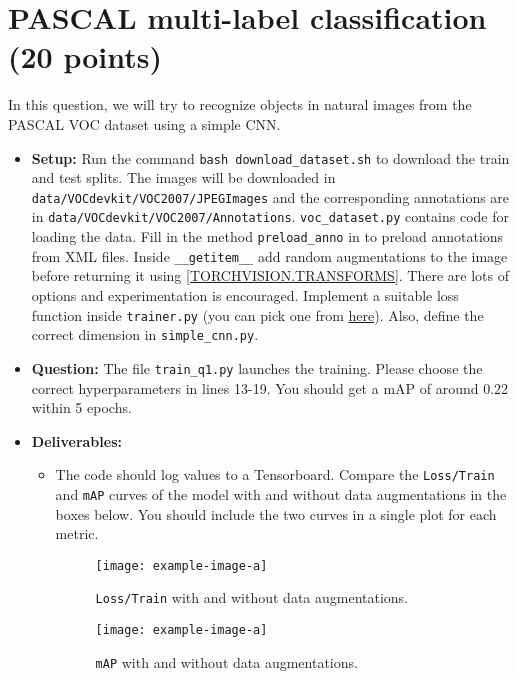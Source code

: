 \documentclass[11pt,addpoints,answers]{exam}
\numberwithin{equation}{section} %
\numberwithin{figure}{section} %
\numberwithin{table}{section} %
\begin{document}
\section{PASCAL multi-label classification (20 points)}
In this question, we will try to recognize objects in natural images from the PASCAL VOC dataset using a simple CNN.
\begin{itemize}
    \item \textbf{Setup:}  Run the command \texttt{bash download\_dataset.sh} to download the train and test splits. The images will be downloaded in 
\texttt{data/VOCdevkit/VOC2007/JPEGImages} and the corresponding annotations are in {\texttt{data/VOCdevkit/VOC2007/Annotations}}. \texttt{voc\_dataset.py} contains code for loading the data. Fill in the method \texttt{preload\_anno} in to preload annotations from XML files. Inside \texttt{\_\_getitem\_\_} add random augmentations to the image before returning it using \href{https://pytorch.org/vision/stable/transforms.html}{[TORCHVISION.TRANSFORMS]}. There are lots of options and experimentation is encouraged. Implement a suitable loss function inside \texttt{trainer.py} (you can pick one from \href{https://pytorch.org/docs/stable/nn.html#loss-functions}{here}). Also, define the correct dimension in \texttt{simple\_cnn.py}. 
\item \textbf{Question:} The file \texttt{train\_q1.py} launches the training. Please choose the correct hyperparameters in lines 13-19. You should get a mAP of around 0.22 within 5 epochs.
\item \textbf{Deliverables:} 
    \begin{itemize}
        \item The code should log values to a Tensorboard. Compare the \texttt{Loss/Train} and \texttt{mAP} curves of the model with and without data augmentations in the boxes below. You should include the two curves in a single plot for each metric.

        \begin{figure}[H]
            \centering
            \texttt{[image: example-image-a]}
            \caption{\texttt{Loss/Train} with and without data augmentations.}
            \label{fig:q1_1_compare_loss}
        \end{figure}
        
        \begin{figure}[H]
            \centering
            \texttt{[image: example-image-a]}
            \caption{\texttt{mAP} with and without data augmentations.}
            \label{fig:q1_1_compare_map}
        \end{figure}
        

\end{itemize}
\end{itemize}
\end{document}
